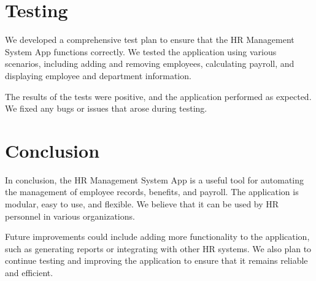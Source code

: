 \documentclass{article}
\begin{document}
\section{Testing}


We developed a comprehensive test plan to ensure that the HR Management System App functions correctly. We tested the application using various scenarios, including adding and removing employees, calculating payroll, and displaying employee and department information.

The results of the tests were positive, and the application performed as expected. We fixed any bugs or issues that arose during testing.

\section{Conclusion}

In conclusion, the HR Management System App is a useful tool for automating the management of employee records, benefits, and payroll. The application is modular, easy to use, and flexible. We believe that it can be used by HR personnel in various organizations.

Future improvements could include adding more functionality to the application, such as generating reports or integrating with other HR systems. We also plan to continue testing and improving the application to ensure that it remains reliable and efficient.
\end{document}
